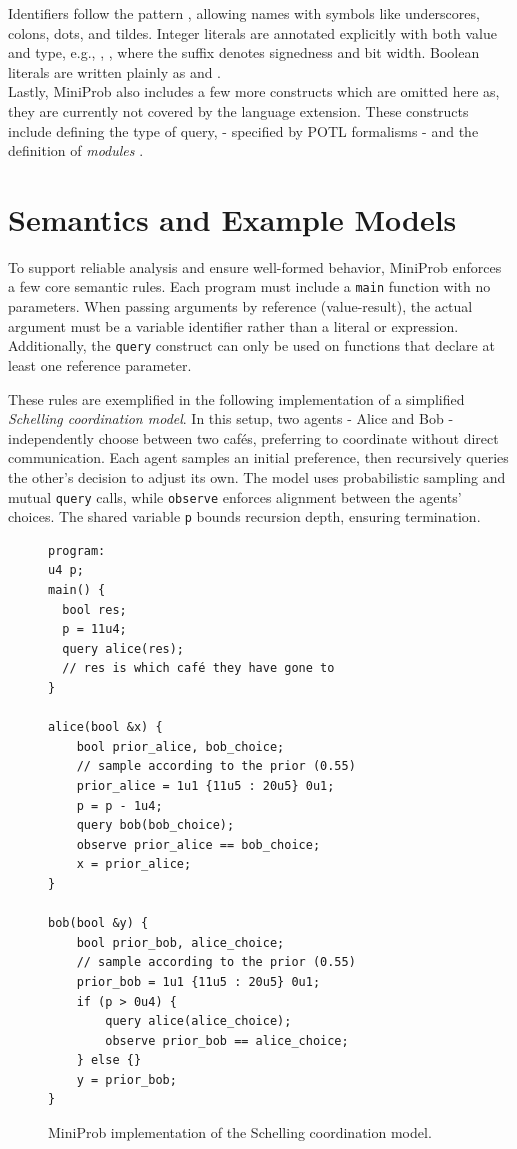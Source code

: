 Identifiers follow the pattern \code{[a-zA-Z\_][a-zA-Z0-9.\_\:$\sim$]*}, allowing names with symbols like underscores, colons, dots, and tildes.
Integer literals are annotated explicitly with both value and type, e.g., , , where the suffix denotes signedness and bit width.
Boolean literals are written plainly as  and .
\\

Lastly, MiniProb also includes a few more constructs which are omitted here as, they are currently not covered by the language extension.
These constructs include  defining the type of query,  - specified by POTL formalisms - and the definition of \emph{modules} \cite{guideMiniProb}.

\section{Semantics and Example Models}

To support reliable analysis and ensure well-formed behavior, MiniProb enforces a few core semantic rules. Each program must include a \texttt{main} function with no parameters. When passing arguments by reference (value-result), the actual argument must be a variable identifier rather than a literal or expression. Additionally, the \texttt{query} construct can only be used on functions that declare at least one reference parameter.

These rules are exemplified in the following implementation of a simplified \textit{Schelling coordination model}. In this setup, two agents - Alice and Bob - independently choose between two cafés, preferring to coordinate without direct communication. Each agent samples an initial preference, then recursively queries the other's decision to adjust its own. The model uses probabilistic sampling and mutual \texttt{query} calls, while \texttt{observe} enforces alignment between the agents’ choices. The shared variable \texttt{p} bounds recursion depth, ensuring termination.
\begin{figure}[ht]
  \centering
  \begin{minipage}{0.85\textwidth}
    \begin{verbatim}
program:
u4 p;
main() {
  bool res;
  p = 11u4;
  query alice(res);
  // res is which café they have gone to
}

alice(bool &x) {
    bool prior_alice, bob_choice;
    // sample according to the prior (0.55)
    prior_alice = 1u1 {11u5 : 20u5} 0u1;
    p = p - 1u4;
    query bob(bob_choice);
    observe prior_alice == bob_choice;
    x = prior_alice;
}

bob(bool &y) {
    bool prior_bob, alice_choice;
    // sample according to the prior (0.55)
    prior_bob = 1u1 {11u5 : 20u5} 0u1;
    if (p > 0u4) {
        query alice(alice_choice);
        observe prior_bob == alice_choice;
    } else {}
    y = prior_bob;
}
\end{verbatim}
  \end{minipage}
  \caption{MiniProb implementation of the Schelling coordination model.}
  \label{fig:schelling}
\end{figure}